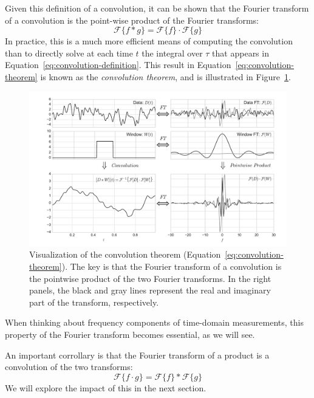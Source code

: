 \documentclass[preprint]{aastex}
\newcommand{\fig}[1]{Figure~\ref{fig:#1}}
\newcommand{\figlabel}[1]{\label{fig:#1}}
\newcommand{\Eq}[1]{Equation~\ref{eq:#1}}
\newcommand{\eq}[1]{\Eq{#1}}
\newcommand{\eqlabel}[1]{\label{eq:#1}}
\begin{document}
Given this definition of a convolution, it can be shown that the Fourier transform of a convolution is the point-wise product of the Fourier transforms:
\begin{equation}
  \mathcal{F}\{f \ast g\} = \mathcal{F}\{f\} \cdot \mathcal{F}\{g\}
  \eqlabel{convolution-theorem}
\end{equation}
In practice, this is a much more efficient means of computing the convolution
than to directly solve at each time $t$ the integral over $\tau$ that appears
in \eq{convolution-definition}.
This result in \eq{convolution-theorem} is known as the
{\it convolution theorem}, and is illustrated in \fig{convolution-theorem}.
\begin{figure}[ht]
  \centering
  \includegraphics[width=\textwidth]{fig05_Convolution_Theorem}
  \caption{Visualization of the convolution theorem (\eq{convolution-theorem}).
    The key is that the Fourier transform of
    a convolution is the pointwise product of the two Fourier transforms.
    In the right panels, the black and gray lines represent the real and
    imaginary part of the transform, respectively.
    \figlabel{convolution-theorem}}
\end{figure}
When thinking about frequency components of time-domain measurements, this
property of the Fourier transform becomes essential, as we will see.

An important corrollary is that the Fourier transform of a product is a convolution of the two transforms:
\begin{equation}
  \mathcal{F}\{f \cdot g\} = \mathcal{F}\{f\} \ast \mathcal{F}\{g\}
  \eqlabel{convolution-theorem-inverse}
\end{equation}
We will explore the impact of this in the next section.
\end{document}
